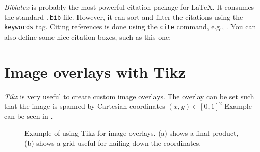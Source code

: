 \emph{Biblatex} is probably the most powerful citation package for LaTeX.
It consumes the standard \texttt{.bib} file. However, it can sort and filter the citations using the \texttt{keywords} tag.
Citing references is done using the \texttt{cite} command, e.g., \cite{baca2021mrs}.
You can also define some nice citation boxes, such as this one:

\section{Image overlays with Tikz}

\emph{Tikz} is very useful to create custom image overlays.
The overlay can be set such that the image is spanned by Cartesian coordinates $\left(x, y\right) \in \left[0, 1\right]^2$
Example can be seen in .

\begin{figure}[!t]

  \centering

  

  \caption{Example of using Tikz for image overlays. (a) shows a final product, (b) shows a grid useful for nailing down the coordinates.}
  \label{fig:tikz_overlay}

\end{figure}
